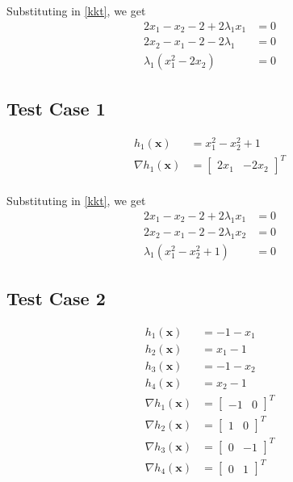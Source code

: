 \documentclass[a4paper]{article}
\begin{document}
Substituting in \eqref{kkt}, we get
\begin{align*}
2 x_1 - x_2 - 2 + 2 \lambda_1 x_1 &= 0 \\
2 x_2 - x_1 - 2 - 2 \lambda_1 &= 0 \\
\lambda_1 (x_1^2 - 2 x_2) &= 0
\end{align*}

\subsection{Test Case 1}

\begin{align*}
h_1(\textbf{x}) &= x_1^2 - x_2^2 + 1 \\
\nabla h_1(\textbf{x}) &= \begin{bmatrix} 2 x_1 & -2 x_2 \end{bmatrix} ^T \\
\end{align*}

Substituting in \eqref{kkt}, we get
\begin{align*}
2 x_1 - x_2 - 2 + 2 \lambda_1 x_1 &= 0 \\
2 x_2 - x_1 - 2 - 2 \lambda_1 x_2 &= 0 \\
\lambda_1 (x_1^2 - x_2^2 + 1) &= 0
\end{align*}

\subsection{Test Case 2}

\begin{align*}
h_1(\textbf{x}) &= -1 - x_1 \\
h_2(\textbf{x}) &= x_1 - 1 \\
h_3(\textbf{x}) &= -1 - x_2 \\
h_4(\textbf{x}) &= x_2 - 1 \\
\nabla h_1(\textbf{x}) &= \begin{bmatrix} -1 & 0 \end{bmatrix} ^T \\
\nabla h_2(\textbf{x}) &= \begin{bmatrix} 1 & 0 \end{bmatrix} ^T \\
\nabla h_3(\textbf{x}) &= \begin{bmatrix} 0 & -1 \end{bmatrix} ^T \\
\nabla h_4(\textbf{x}) &= \begin{bmatrix} 0 & 1 \end{bmatrix} ^T \\
\end{align*}
\end{document}
